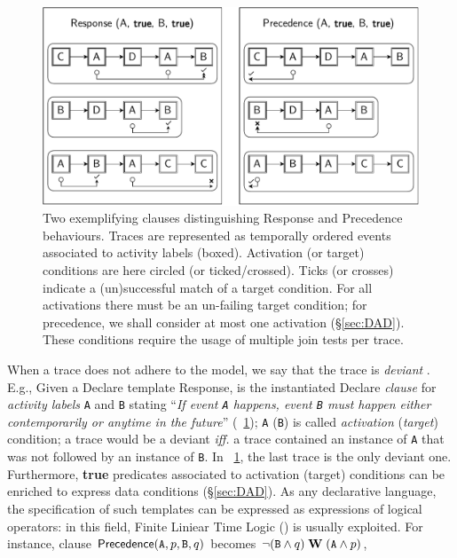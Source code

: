\begin{figure}
	\centering
	\includegraphics[width=.7\textwidth]{images/ActivationTargetExample.pdf}
	\caption{Two exemplifying clauses distinguishing \textsf{Response} and \textsf{Precedence} behaviours. Traces are represented as temporally ordered events associated to activity labels (boxed). Activation  (or target) conditions are here circled (or ticked/crossed). Ticks (or crosses) indicate a (un)successful match of a target condition. For all activations there must be an un-failing target condition; for precedence, we shall consider at most one activation (\S\ref{sec:DAD}). These conditions require the usage of multiple join tests per trace.}\label{fig:comparison}
\end{figure}
When a trace does not adhere to the model, we say that the trace is \textit{deviant} \cite{bpm21}. %
E.g., Given a Declare template \textsf{Response},  is the instantiated Declare \textit{clause} for \textit{activity labels} \texttt{A} and \texttt{B} stating ``\emph{If event \texttt{A}  happens, event \texttt{B}  must happen either contemporarily or anytime in the future}'' (\figurename~\ref{fig:comparison}); \texttt{A}  (\texttt{B}) is called  \textit{activation} (\textit{target}) condition; a trace would be a deviant \emph{iff.} a trace contained an instance of \texttt{A}  that was not followed by an instance of \texttt{B}. In \figurename~\ref{fig:comparison}, the last trace is the only deviant one. Furthermore, \textbf{true} predicates associated to activation (target) conditions can be enriched to express data conditions (\S\ref{sec:DAD}). As any declarative language, the specification of such templates can be expressed as expressions of logical operators: in this field, Finite Liniear Time Logic (\LTLf) is usually exploited. For instance, clause $\textsf{Precedence}(\texttt{A},p,\texttt{B},q)$ becomes ${\neg(\texttt{B} \wedge q)}\;\mathbf{W}\;{(\texttt{A} \wedge p)}$, %
